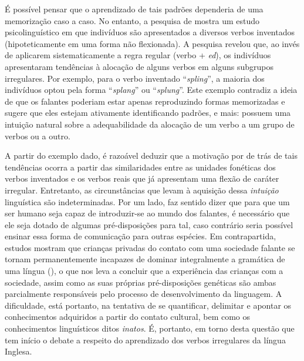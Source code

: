 É possível pensar que o aprendizado de tais padrões dependeria de uma memorização caso a caso. No entanto, a pesquisa de \cite{Bybee:1983} mostra um estudo psicolinguístico em que indivíduos são apresentados a diversos verbos inventados (hipoteticamente em uma forma não flexionada). A pesquisa revelou que, ao invés de aplicarem sistematicamente a regra regular (verbo + \textit{ed}), os indivíduos apresentaram tendências à alocação de alguns verbos em alguns subgrupos irregulares. %
Por exemplo, para o verbo inventado “\textit{spling}”, a maioria dos indivíduos optou pela forma “\textit{splang}”  ou “\textit{splung}”. Este exemplo contradiz a ideia de que os falantes poderiam estar apenas reproduzindo formas memorizadas e sugere que eles estejam ativamente identificando padrões, e mais: possuem uma intuição natural sobre a adequabilidade da alocação de um verbo a um grupo de verbos ou a outro. 

A partir do exemplo dado, é razoável deduzir que a motivação por de trás de tais tendências ocorra a partir das similaridades entre as unidades fonéticas dos verbos inventados e os verbos reais que já apresentam uma flexão de caráter irregular. Entretanto, as circunstâncias que levam à aquisição dessa \textit{intuição} linguística são indeterminadas. Por um lado, faz sentido dizer que para que um ser humano seja capaz de introduzir-se ao mundo dos falantes, é necessário que ele seja dotado de algumas pré-disposições para tal, caso contrário seria possível ensinar essa forma de comunicação para outras espécies. Em contrapartida, estudos mostram que crianças privadas do contato com uma sociedade falante se tornam permanentemente incapazes de dominar integralmente a gramática de uma língua (\cite{Pinker:languageinstinct}), o que nos leva a concluir que a experiência das crianças com a sociedade, assim como as suas próprias pré-disposições genéticas são ambas parcialmente responsáveis pelo processo de desenvolvimento da linguagem. A dificuldade, está portanto, na tentativa de se quantificar, delimitar e apontar os conhecimentos adquiridos a partir do contato cultural, bem como os conhecimentos linguísticos ditos \textit{inatos}. É, portanto, em torno desta questão que tem início o debate a respeito do aprendizado dos verbos irregulares da língua Inglesa.

